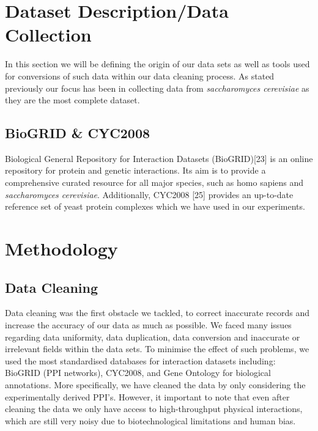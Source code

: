 \documentclass[9pt]{article}
\begin{document}
\section{Dataset Description/Data Collection}
In this section we will be defining the origin of our data sets as well as tools used for conversions of such data within our data cleaning process. As stated previously our focus has been in collecting data from \textit{saccharomyces cerevisiae} as they are the most complete dataset.

\subsection{BioGRID \& CYC2008}
Biological General Repository for Interaction Datasets (BioGRID)[23] is an online repository for protein and genetic interactions. Its aim is to provide a comprehensive curated resource for all major species, such as homo sapiens and \textit{saccharomyces cerevisiae}. Additionally, CYC2008 [25] provides an up-to-date reference set of yeast protein complexes which we have used in our experiments. 

\section{Methodology}
\subsection{Data Cleaning}
Data cleaning was the first obstacle we tackled, to correct inaccurate records and increase the accuracy of our data as much as possible. We faced many issues regarding data uniformity, data duplication, data conversion and inaccurate or irrelevant fields within the data sets. To minimise the effect of such problems, we used the most standardised databases for interaction datasets including: BioGRID (PPI networks), CYC2008, and Gene Ontology for biological annotations. More specifically, we have cleaned the data by only considering the experimentally derived PPI’s. However, it important to note that even after cleaning the data we only have access to high-throughput physical interactions, which are still very noisy due to biotechnological limitations and human bias.
\end{document}
